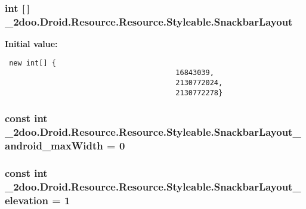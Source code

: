 \hypertarget{class__2doo_1_1_droid_1_1_resource_1_1_styleable_6bc6490d33c608c748714bff87be3313}{
\subsubsection[{SnackbarLayout}]{\setlength{\rightskip}{0pt plus 5cm}int \mbox{[}$\,$\mbox{]} \_\-2doo.Droid.Resource.Resource.Styleable.SnackbarLayout}}
\label{class__2doo_1_1_droid_1_1_resource_1_1_styleable_6bc6490d33c608c748714bff87be3313}


\textbf{Initial value:}

\begin{Code}\begin{verbatim} new int[] {
                                        16843039,
                                        2130772024,
                                        2130772278}
\end{verbatim}
\end{Code}
\hypertarget{class__2doo_1_1_droid_1_1_resource_1_1_styleable_7294a484422d9d185e6e64e3b0e971ea}{
\subsubsection[{SnackbarLayout\_\-android\_\-maxWidth}]{\setlength{\rightskip}{0pt plus 5cm}const int \_\-2doo.Droid.Resource.Resource.Styleable.SnackbarLayout\_\-android\_\-maxWidth = 0}}
\label{class__2doo_1_1_droid_1_1_resource_1_1_styleable_7294a484422d9d185e6e64e3b0e971ea}


\hypertarget{class__2doo_1_1_droid_1_1_resource_1_1_styleable_66ce70df2b211dd963d4c20b5277f63c}{
\subsubsection[{SnackbarLayout\_\-elevation}]{\setlength{\rightskip}{0pt plus 5cm}const int \_\-2doo.Droid.Resource.Resource.Styleable.SnackbarLayout\_\-elevation = 1}}
\label{class__2doo_1_1_droid_1_1_resource_1_1_styleable_66ce70df2b211dd963d4c20b5277f63c}


